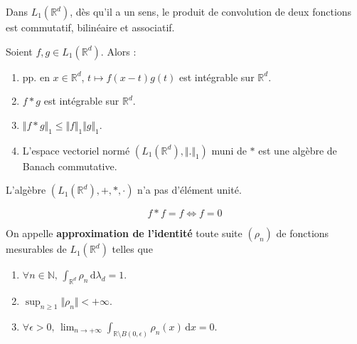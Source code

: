 	\begin{proposition}
		Dans $L_1(\mathbb{R}^d)$, dès qu'il a un sens, le produit de convolution de deux fonctions est commutatif, bilinéaire et associatif.
	\end{proposition}

	\begin{theorem}
		Soient $f, g \in L_1(\mathbb{R}^d)$. Alors :
		\begin{enumerate}[label=(\roman*)]
			\item pp. en $x \in \mathbb{R}^d$, $t \mapsto f(x-t)g(t)$ est intégrable sur $\mathbb{R}^d$.
			\item $f * g$ est intégrable sur $\mathbb{R}^d$.
			\item $\Vert f * g \Vert_1 \leq \Vert f \Vert_1 \Vert g \Vert_1$.
			\item L'espace vectoriel normé $(L_1(\mathbb{R}^d), \Vert . \Vert_1)$ muni de $*$ est une algèbre de Banach commutative.
		\end{enumerate}
	\end{theorem}


	\begin{proposition}
		L'algèbre $(L_1(\mathbb{R}^d), +, *, \cdot)$ n'a pas d'élément unité.
	\end{proposition}

	\begin{application}
		\[ f * f = f \iff f = 0 \]
	\end{application}


	\begin{definition}
		On appelle \textbf{approximation de l'identité} toute suite $(\rho_n)$ de fonctions mesurables de $L_1(\mathbb{R}^d)$ telles que
		\begin{enumerate}[label=(\roman*)]
			\item $\forall n \in \mathbb{N}, \, \int_{\mathbb{R}^d} \rho_n \, \mathrm{d}\lambda_d = 1$.
			\item $\sup_{n \geq 1} \Vert \rho_n \Vert < +\infty$.
			\item $\forall \epsilon > 0, \, \lim_{n \rightarrow +\infty} \int_{\mathbb{R} \setminus B(0, \epsilon)} \rho_n(x) \, \mathrm{d}x = 0$.
		\end{enumerate}
	\end{definition}



